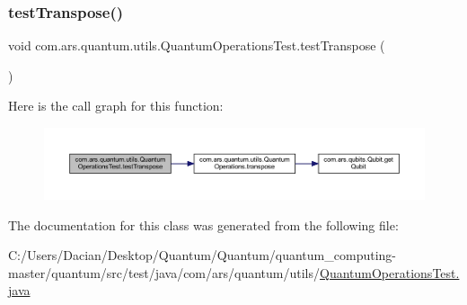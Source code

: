 \subsubsection{\texorpdfstring{test\+Transpose()}{testTranspose()}}
{\footnotesize\ttfamily void com.\+ars.\+quantum.\+utils.\+Quantum\+Operations\+Test.\+test\+Transpose (\begin{DoxyParamCaption}{ }\end{DoxyParamCaption})}

Here is the call graph for this function\+:\nopagebreak
\begin{figure}[H]
\begin{center}
\leavevmode
\includegraphics[width=350pt]{classcom_1_1ars_1_1quantum_1_1utils_1_1_quantum_operations_test_a09270ff6a4f9ed716f38d2a911495e4a_cgraph}
\end{center}
\end{figure}


The documentation for this class was generated from the following file\+:\begin{DoxyCompactItemize}
\item 
C\+:/\+Users/\+Dacian/\+Desktop/\+Quantum/\+Quantum/quantum\+\_\+computing-\/master/quantum/src/test/java/com/ars/quantum/utils/\hyperlink{_quantum_operations_test_8java}{Quantum\+Operations\+Test.\+java}\end{DoxyCompactItemize}
